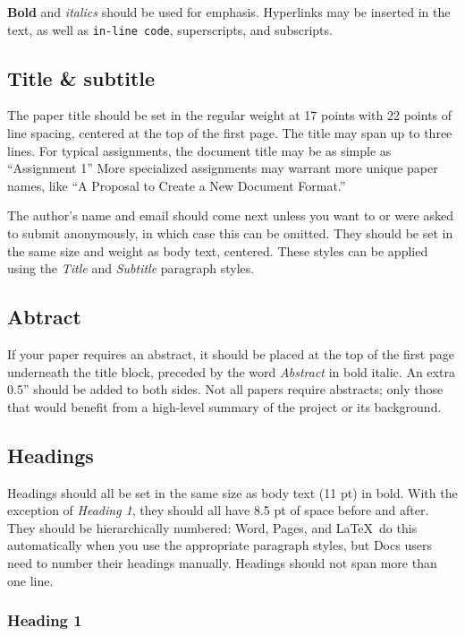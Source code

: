 \documentclass{jdf}
\begin{document}
\textbf{Bold} and \emph{italics} should be used for emphasis. Hyperlinks
may be inserted in the text, as well as \texttt{in-line\ code},
superscripts, and subscripts.

\hypertarget{title-subtitle}{%
\subsection{Title \& subtitle}\label{title-subtitle}}

The paper title should be set in the regular weight at 17 points with 22
points of line spacing, centered at the top of the first page. The title
may span up to three lines. For typical assignments, the document title
may be as simple as ``Assignment 1'' More specialized assignments may
warrant more unique paper names, like ``A Proposal to Create a New
Document Format.''

The author's name and email should come next unless you want to or were
asked to submit anonymously, in which case this can be omitted. They
should be set in the same size and weight as body text, centered. These
styles can be applied using the \emph{Title} and \emph{Subtitle}
paragraph styles.

\hypertarget{abtract}{%
\subsection{Abtract}\label{abtract}}

If your paper requires an abstract, it should be placed at the top of
the first page underneath the title block, preceded by the word
\emph{Abstract} in bold italic. An extra 0.5'' should be added to both
sides. Not all papers require abstracts; only those that would benefit
from a high-level summary of the project or its background.

\hypertarget{headings}{%
\subsection{Headings}\label{headings}}

Headings should all be set in the same size as body text (11 pt) in
bold. With the exception of \emph{Heading 1}, they should all have 8.5
pt of space before and after. They should be hierarchically numbered:
Word, Pages, and \LaTeX~do this automatically when you use the
appropriate paragraph styles, but Docs users need to number their
headings manually. Headings should not span more than one line.

\hypertarget{heading-1}{%
\subsubsection{Heading 1}\label{heading-1}}
\end{document}
